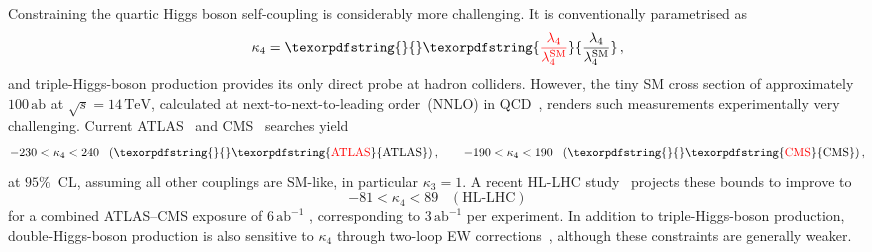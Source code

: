 \documentclass{SciPost}
\def\beq{\begin{equation}}
\def\eeq{\end{equation}}
\providecommand{\DIFaddtex}[1]{{\protect\color{red} #1}} %
\providecommand{\DIFdeltex}[1]{} %
\providecommand{\DIFaddbegin}{} %
\providecommand{\DIFaddend}{} %
\providecommand{\DIFdelbegin}{} %
\providecommand{\DIFdelend}{} %
\providecommand{\DIFadd}[1]{\texorpdfstring{\DIFaddtex{#1}}{#1}} %
\providecommand{\DIFdel}[1]{\texorpdfstring{\DIFdeltex{#1}}{}} %
\begin{document}
Constraining the quartic Higgs \DIFaddbegin \DIFadd{boson }\DIFaddend self-coupling is considerably more challenging. It is conventionally parametrised as
\beq \label{eq:kappa4}
\kappa_4 = \DIFdelbegin \DIFdel{\frac{\lambda_4}{\lambda_4^{\rm SM}} }\DIFdelend \DIFaddbegin \DIFadd{\frac{\lambda_4}{\lambda_4^{\mathrm{SM}}} }\DIFaddend \,,
\eeq
and \DIFdelbegin \DIFdel{triple-Higgs }\DIFdelend \DIFaddbegin \DIFadd{triple-Higgs-boson }\DIFaddend production provides its only direct probe at hadron colliders. However, the tiny SM cross section of approximately $100\,\mathrm{ab}$ at $\sqrt{s}=14\,\mathrm{TeV}$, calculated at next-to-next-to-leading order~(NNLO) in QCD~\cite{deFlorian:2019app}, renders such measurements experimentally very challenging. Current ATLAS~\cite{ATLAS:2024xcs} and CMS~\cite{CMS-PAS-HIG-24-012} searches yield
\beq \label{eq:kappa4bounds}
-230 < \kappa_4 < 240 \;\;\;(\DIFdelbegin %
\DIFdel{ATLAS}\DIFdelend \DIFaddbegin \DIFadd{\text{ATLAS}}\DIFaddend ) \,, \qquad
-190 < \kappa_4 < 190 \;\;\;(\DIFdelbegin %
\DIFdel{CMS}\DIFdelend \DIFaddbegin \DIFadd{\text{CMS}}\DIFaddend ) \,,
\eeq
at \DIFdelbegin \DIFdel{the }\DIFdelend $95\%$~CL, assuming all other couplings are SM-like, in particular $\kappa_3=1$. A recent HL-LHC study~\cite{Ding:2026qto} projects these bounds to improve to
\beq \DIFaddbegin \label{eq:kappa4boundsHL}
\DIFaddend -81 < \kappa_4 < 89\;\;\;(\text{HL-LHC})
\eeq
\DIFdelbegin \DIFdel{with an integrated luminosity }\DIFdelend \DIFaddbegin \DIFadd{for a combined ATLAS--CMS exposure }\DIFaddend of $6\,\mathrm{ab}^{-1}$\DIFaddbegin \DIFadd{, corresponding to $3\,\mathrm{ab}^{-1}$ per experiment}\DIFaddend . In addition to \DIFdelbegin \DIFdel{triple-Higgs production, double-Higgs }\DIFdelend \DIFaddbegin \DIFadd{triple-Higgs-boson production, double-Higgs-boson }\DIFaddend production is also sensitive to $\kappa_4$ through two-loop EW corrections~\cite{Bizon:2018syu,Borowka:2018pxx,Li:2024iio,Ding:2026qto}, although these constraints are generally weaker.
\end{document}
